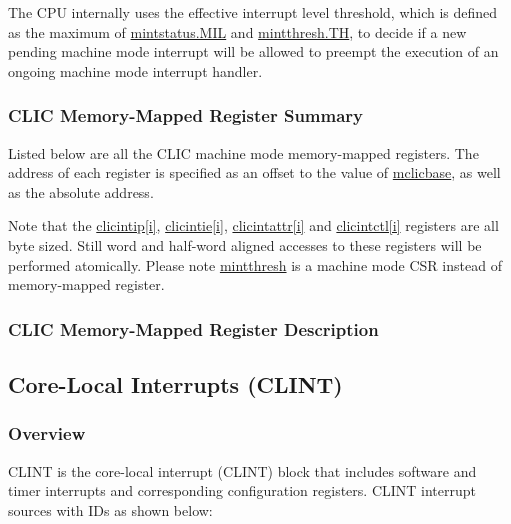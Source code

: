 \documentclass[main\_\_EN.tex]{subfiles}
\begin{document}
The CPU internally uses the effective interrupt level threshold, which is defined as the maximum of \hyperref[fielddesc:MINTSTATUS_MIL]{{mintstatus.MIL}} and \hyperref[fielddesc:MINTTHRESH_TH]{{mintthresh.TH}}, to decide if a new pending machine mode interrupt will be allowed to preempt the execution of an ongoing machine mode interrupt handler.


\hypertarget{riscvcpu-clic-memmap-reg-summ}{}
\subsubsection{CLIC Memory-Mapped Register Summary}
\label{sec:riscvcpu-clic-memmap-reg-summ}

Listed below are all the CLIC machine mode memory-mapped registers. The address of each register is specified as an offset to the value of  \hyperref[fielddesc:MCLICBASE]{mclicbase}, as well as the absolute address.

Note that the \hyperref[regdesc:MCLICINTIP_REG_i]{clicintip[i]}, \hyperref[regdesc:MCLICINTIE_REG_i]{clicintie[i]}, \hyperref[regdesc:MCLICINTATTR_REG_i]{clicintattr[i]} and \hyperref[regdesc:MCLICINTCTL_REG_i]{clicintctl[i]} registers are all byte sized. Still word and half-word aligned accesses to these registers will be performed atomically. Please note \hyperref[regdesc:MINTTHRESH]{mintthresh} is a machine mode CSR instead of memory-mapped register.





\hypertarget{riscvcpu-clic-memmap-reg}{}
\subsubsection{CLIC Memory-Mapped Register Description}
\label{sec:riscvcpu-clic-memmap-reg}



\newpage
\subsection{Core-Local Interrupts (CLINT)}
\label{sec:riscvcpu-clint}
\subsubsection{Overview}
\label{sec:riscvcpu-clint-overview}
CLINT is the core-local interrupt (CLINT) block that includes software and timer interrupts and corresponding configuration registers. CLINT interrupt sources with IDs as shown below:
\end{document}
